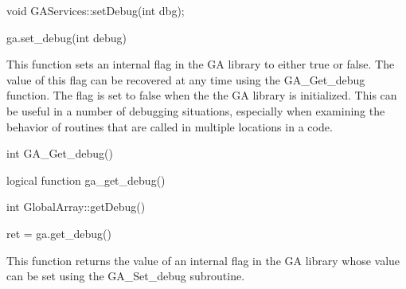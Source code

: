 \documentclass[10pt]{article}
\begin{document}
\begin{cxxapi}
\begin{cxxcode}
void GAServices::setDebug(int dbg);
\end{cxxcode}
\begin{funcargs}
\end{funcargs}
\end{cxxapi}

\begin{pyapi}
\begin{pycode}
ga.set_debug(int debug)
\end{pycode}
\end{pyapi}

\local

\begin{desc}
This function sets an internal flag in the GA library to either true or false.
The value of this flag can be recovered at any time using the GA_Get_debug
function. The flag is set to false when the the GA library is initialized. This
can be useful in a number of debugging situations, especially when examining
the behavior of routines that are called in multiple locations in a code.
\end{desc}



\begin{capi}
\begin{ccode}
int GA_Get_debug()
\end{ccode}
\end{capi}

\begin{fapi}
\begin{fcode}
logical function ga_get_debug()
\end{fcode}
\end{fapi}

\begin{cxxapi}
\begin{cxxcode}
int GlobalArray::getDebug()
\end{cxxcode}
\end{cxxapi}

\begin{pyapi}
\begin{pycode}
ret = ga.get_debug()
\end{pycode}
\end{pyapi}

\local

\begin{desc}
This function returns the value of an internal flag in the GA library whose
value can be set using the GA_Set_debug subroutine.
\end{desc}
\end{document}

